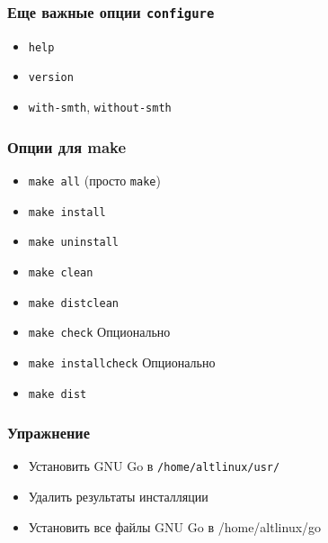 \begin{frame}
 \frametitle{Еще важные опции \texttt{configure}}
 \begin{itemize}
   \item \texttt{help}
   \item \texttt{version}
   \item \texttt{with-smth}, \texttt{without-smth}
  \end{itemize}
\end{frame}


\begin{frame}
  \frametitle{Опции для make}
  \begin{itemize}
    \item \texttt{make all} (просто \texttt{make})
    \item \texttt{make install}
    \item \texttt{make uninstall}
    \item \texttt{make clean}
    \item \texttt{make distclean}
    \item \texttt{make check} Опционально
    \item \texttt{make installcheck} Опционально
    \item \texttt{make dist}
  \end{itemize}
\end{frame}

\begin{frame}
 \frametitle{Упражнение}
  \begin{itemize}
    \item Установить GNU Go в \texttt{/home/altlinux/usr/}
    \item Удалить результаты инсталляции
    \item Установить все файлы GNU Go в /home/altlinux/go
  \end{itemize}
\end{frame}

